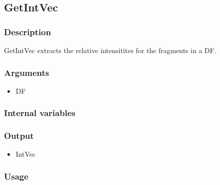 \subsection{GetIntVec}\label{GetIntVec}
\subsubsection{Description}
GetIntVec extracts the relative intensitites for the fragments in a DF.
\subsubsection{Arguments}
\begin{itemize}
\item DF
\end{itemize}
\subsubsection{Internal variables}
\subsubsection{Output}
\begin{itemize}
\item IntVec
\end{itemize}
\subsubsection{Usage}
